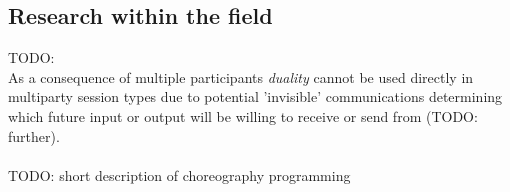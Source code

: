 \subsection{Research within the field}
TODO: \\
 As a consequence of multiple participants \textit{duality} cannot be used directly in multiparty session types due to potential 'invisible' communications determining which future input or output will be willing to receive or send from (TODO: further).   %
 \\ \\
TODO: short description of choreography programming

